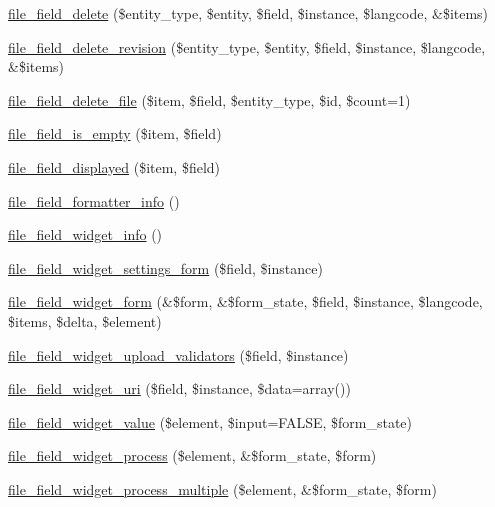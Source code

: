 \begin{DoxyCompactItemize}
\item 
\hyperlink{file_8field_8inc_a33f51903eac915f080a4621133896352}{file\_\-field\_\-delete} (\$entity\_\-type, \$entity, \$field, \$instance, \$langcode, \&\$items)
\item 
\hyperlink{file_8field_8inc_ae78329c465bca7d8cdad9d317db666d4}{file\_\-field\_\-delete\_\-revision} (\$entity\_\-type, \$entity, \$field, \$instance, \$langcode, \&\$items)
\item 
\hyperlink{file_8field_8inc_a5e89e8a4352c9a6444d8736d94aa3cb9}{file\_\-field\_\-delete\_\-file} (\$item, \$field, \$entity\_\-type, \$id, \$count=1)
\item 
\hyperlink{file_8field_8inc_a677d2a195d30d6c25769966bc322a899}{file\_\-field\_\-is\_\-empty} (\$item, \$field)
\item 
\hyperlink{file_8field_8inc_a306d17ad8da55fcbc508aa273abc94d1}{file\_\-field\_\-displayed} (\$item, \$field)
\item 
\hyperlink{file_8field_8inc_a03fe1882e784494cd80b0936108a2fb2}{file\_\-field\_\-formatter\_\-info} ()
\item 
\hyperlink{file_8field_8inc_a5857e6006412911abf7dbf3efd8d4c6d}{file\_\-field\_\-widget\_\-info} ()
\item 
\hyperlink{file_8field_8inc_a2853c788d6a2b924d8bd387c948fb25c}{file\_\-field\_\-widget\_\-settings\_\-form} (\$field, \$instance)
\item 
\hyperlink{file_8field_8inc_a83f270ff3895b6a02c1c7cdcbffcd03f}{file\_\-field\_\-widget\_\-form} (\&\$form, \&\$form\_\-state, \$field, \$instance, \$langcode, \$items, \$delta, \$element)
\item 
\hyperlink{file_8field_8inc_a398d58958fb8ed982650bab14fcf8408}{file\_\-field\_\-widget\_\-upload\_\-validators} (\$field, \$instance)
\item 
\hyperlink{file_8field_8inc_a3f46c5f930c4da9f64ea232b936c04b1}{file\_\-field\_\-widget\_\-uri} (\$field, \$instance, \$data=array())
\item 
\hyperlink{file_8field_8inc_a2ddca1a735dd1b46522285ebe3b5ca93}{file\_\-field\_\-widget\_\-value} (\$element, \$input=FALSE, \$form\_\-state)
\item 
\hyperlink{file_8field_8inc_a6dbe1f9dbe76cd478f57ae60409307b2}{file\_\-field\_\-widget\_\-process} (\$element, \&\$form\_\-state, \$form)
\item 
\hyperlink{file_8field_8inc_a4f8841b3519c2ead7100f1e74e129483}{file\_\-field\_\-widget\_\-process\_\-multiple} (\$element, \&\$form\_\-state, \$form)
\item 

\end{DoxyCompactItemize}
